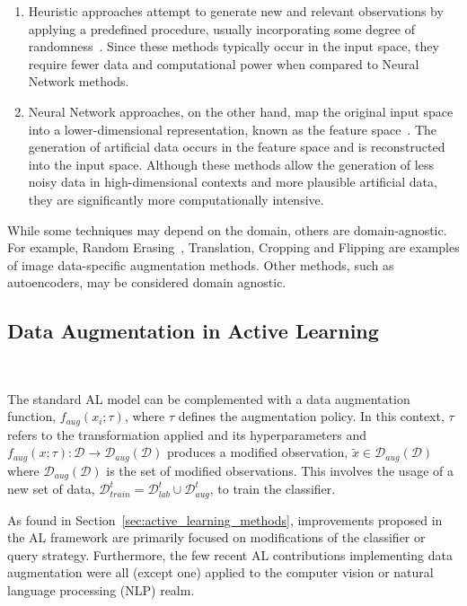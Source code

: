 \documentclass[10pt,journal,compsoc]{IEEEtran}
\begin{document}
\begin{enumerate}
    \item Heuristic approaches attempt to generate new and relevant
        observations by applying a predefined procedure, usually incorporating
        some degree of randomness~\cite{Kashefi2020}. Since these methods
        typically occur in the input space, they require fewer data and
        computational power when compared to Neural Network methods. 
    \item Neural Network approaches, on the other hand, map the original input
        space into a lower-dimensional representation, known as the feature
        space~\cite{DeVries2017}. The generation of artificial data occurs in
        the feature space and is reconstructed into the input space. Although
        these methods allow the generation of less noisy data in
        high-dimensional contexts and more plausible artificial data, they are
        significantly more computationally intensive. 
\end{enumerate}

While some techniques may depend on the domain, others are domain-agnostic.
For example, Random Erasing~\cite{Zhong2020}, Translation, Cropping and
Flipping are examples of image data-specific augmentation methods. Other
methods, such as autoencoders, may be considered domain agnostic.

\subsection{Data Augmentation in Active Learning
}~\label{sec:data_augmentation_in_al}

The standard AL model can be complemented with a data augmentation function,
$f_{aug}(x_i;\tau)$, where $\tau$ defines the augmentation policy. In this
context, $\tau$ refers to the transformation applied and its hyperparameters
and $f_{aug}(x;\tau): \mathcal{D} \rightarrow \mathcal{D}_{aug}(\mathcal{D})$
produces a modified observation, $\tilde{x} \in
\mathcal{D}_{aug}(\mathcal{D})$ where $\mathcal{D}_{aug}(\mathcal{D})$ is the
set of modified observations. This involves the usage of a new set of data,
$\mathcal{D}_{train}^t = \mathcal{D}_{lab}^t \cup \mathcal{D}_{aug}^t$, to
train the classifier.


As found in Section~\ref{sec:active_learning_methods}, improvements proposed
in the AL framework are primarily focused on modifications of the classifier
or query strategy. Furthermore, the few recent AL contributions implementing
data augmentation were all (except one) applied to the computer vision or
natural language processing (NLP) realm. 
\end{document}
